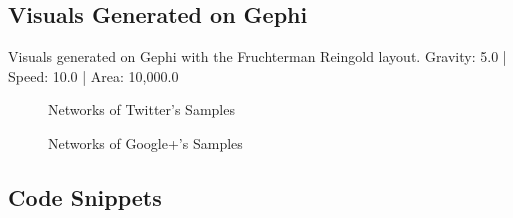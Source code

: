 \documentclass[a4paper, 10pt, conference]{ieeeconf}      %
\begin{document}
\subsection{Visuals Generated on Gephi}
Visuals generated on Gephi with the Fruchterman Reingold layout.
Gravity: 5.0 | Speed: 10.0 | Area: 10,000.0

\begin{figure}[!htb]
      \centering
        \caption{Networks of Twitter's Samples}
\end{figure}
\pagebreak
\begin{figure}[!htb]
      \centering
      \caption{Networks of Google+'s Samples}
      \label{figurelabel}
\end{figure}
\vspace{-2mm}
\subsection{Code Snippets}
\end{document}
